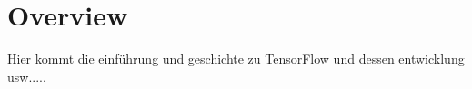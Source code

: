 \chapter{Overview}

\begin{multicols}{2}
Hier kommt die einführung und geschichte zu TensorFlow und dessen entwicklung usw.....
\end{multicols}

\label{cha:Overview}
